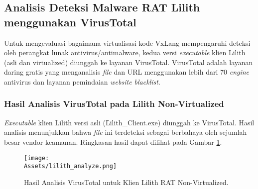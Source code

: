 \subsection{Analisis Deteksi Malware RAT Lilith menggunakan VirusTotal}
\label{subsec:analisis_virustotal_lilith} %
Untuk mengevaluasi bagaimana virtualisasi kode VxLang mempengaruhi deteksi oleh perangkat lunak antivirus/antimalware, kedua versi \textit{executable} klien Lilith (asli dan virtualized) diunggah ke layanan VirusTotal. VirusTotal adalah layanan daring gratis yang menganalisis \textit{file} dan URL menggunakan lebih dari 70 \textit{engine} antivirus dan layanan pemindaian \textit{website blacklist}.

\subsubsection{Hasil Analisis VirusTotal pada Lilith Non-Virtualized}
\textit{Executable} klien Lilith versi asli (\f{Lilith\_Client.exe}) diunggah ke VirusTotal. Hasil analisis menunjukkan bahwa \textit{file} ini terdeteksi sebagai berbahaya oleh sejumlah besar vendor keamanan. Ringkasan hasil dapat dilihat pada Gambar \ref{fig:virustotal_lilith_non_vm_bab5}.

\begin{figure}[H] %
    \centering
    \texttt{[image: \\Assets/lilith\_analyze.png]} %
    \caption{Hasil Analisis VirusTotal untuk Klien Lilith RAT Non-Virtualized.}
    \label{fig:virustotal_lilith_non_vm_bab5}
\end{figure}


